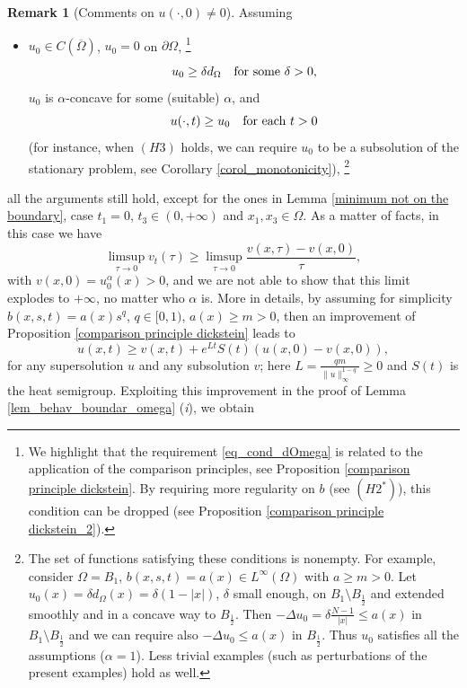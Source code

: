 \documentclass[11pt, reqno]{amsart}
\theoremstyle{definition}
\newtheorem{remark}[lemma]{Remark}
\numberwithin{equation}{section}
\newcommand{\Omegabar}{\overline{\Omega}}
\def\norm#1{\|#1\|}
\begin{document}
\begin{remark}[Comments on $u(\cdot, 0) \neq 0$]
Assuming
	\begin{itemize}
		\item $u_0 \in C(\Omegabar)$, $u_0=0$ on $\partial\Omega$,%
		\footnote{We highlight that the requirement \eqref{eq_cond_dOmega} is related to the application of the comparison principles, see Proposition \ref{comparison principle dickstein}. 
		By requiring more regularity on $b$ (see \hyperlink{H2*}{\( (H2^*) \)}), this condition can be dropped (see Proposition \ref{comparison principle dickstein_2}).}
		\begin{equation}\label{eq_cond_dOmega}
			u_0\geq \delta d_{\Omega} \quad \hbox{for some $\delta>0$},
		\end{equation} 
		$u_0$ is $\alpha$-concave for some (suitable) $\alpha$, and 
		$$u(\cdot, t)\geq u_0 \quad \hbox{for each $t>0$}$$
		(for instance, when \hyperlink{H3}{\( (H3) \)} holds, we can require $u_0$ to be a subsolution of the stationary problem, see Corollary \ref{corol_monotonicity}),%
		\footnote{The set of functions satisfying these conditions is nonempty. 
		For example, consider $\Omega = B_1$, $b(x,s,t)=a(x)\in L^\infty(\Omega)$ with $a\geq m >0$. Let $u_0(x)=\delta d_{\Omega}(x) =\delta(1-|x|)$, $\delta$ small enough, on $B_1\setminus B_{\frac{1}{2}}$ and extended smoothly and in a concave way to $B_{\frac{1}{2}}$. Then $-\Delta u_0=\delta \frac{N-1}{|x|}\leq a(x)$ in $B_1 \setminus B_{\frac{1}{2}}$ and we can require also $-\Delta u_0\leq a(x)$ in $B_{\frac{1}{2}}$. 
		Thus $u_0$ satisfies all the assumptions ($\alpha=1$). Less trivial examples (such as perturbations of the present examples) hold as well.}
	\end{itemize}
	all the arguments still hold, except for the ones in Lemma \ref{minimum not on the boundary}, case $t_1=0$, $t_3 \in (0,+\infty)$ and $x_1, x_3 \in \Omega$. 
	As a matter of facts, in this case we have
	$$\limsup_{\tau \to 0} v_t(\tau) \geq \limsup_{\tau \to 0} \frac{v(x,\tau)-v(x,0)}{\tau},$$
	with $v(x,0)=u_0^{\alpha}(x)>0$, and we are not able to show that this limit explodes to $+\infty$, no matter who $\alpha$ is. More in details, by assuming for simplicity $b(x,s,t)= a(x) s^q$, $q \in [0,1)$, $a(x) \geq m>0$, then an improvement of Proposition \ref{comparison principle dickstein} leads to 
	$$u(x,t) \geq v(x,t) + e^{Lt} S(t) (u(x,0)-v(x,0)),$$
	for any supersolution $u$ and any subsolution $v$; here $L= \frac{q m}{\norm{u}_{\infty}^{1-q}}\geq 0$ and $S(t)$ is the heat semigroup. 
	Exploiting this improvement in the proof of Lemma \ref{lem_behav_boundar_omega} (\textit{i}), we obtain 

\end{remark}
\end{document}
